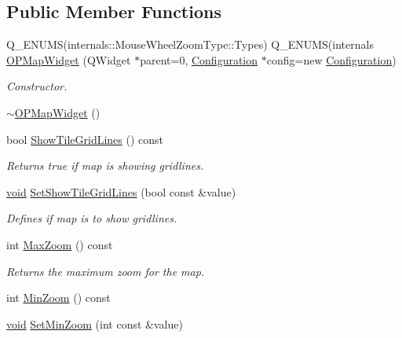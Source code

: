 \subsection*{\-Public \-Member \-Functions}
\begin{DoxyCompactItemize}
\item 
\-Q\-\_\-\-E\-N\-U\-M\-S(internals\-::\-Mouse\-Wheel\-Zoom\-Type\-::\-Types) \*
\-Q\-\_\-\-E\-N\-U\-M\-S(internals \hyperlink{group___o_p_map_widget_ga390f25c0a1e661e1496be4b21c4b4796}{\-O\-P\-Map\-Widget} (\-Q\-Widget $\ast$parent=0, \hyperlink{classmapcontrol_1_1_configuration}{\-Configuration} $\ast$config=new \hyperlink{classmapcontrol_1_1_configuration}{\-Configuration})
\begin{DoxyCompactList}\small\item\em \-Constructor. \end{DoxyCompactList}\item 
\hyperlink{group___o_p_map_widget_gabdcfea44244e345b2e4c966cc8d8c3c6}{$\sim$\-O\-P\-Map\-Widget} ()
\item 
bool \hyperlink{group___o_p_map_widget_ga206c68521bc221bc6db0e63e187c4481}{\-Show\-Tile\-Grid\-Lines} () const 
\begin{DoxyCompactList}\small\item\em \-Returns true if map is showing gridlines. \end{DoxyCompactList}\item 
\hyperlink{group___u_a_v_objects_plugin_ga444cf2ff3f0ecbe028adce838d373f5c}{void} \hyperlink{group___o_p_map_widget_gae09f73466c8f5ba738db48600eab7635}{\-Set\-Show\-Tile\-Grid\-Lines} (bool const \&value)
\begin{DoxyCompactList}\small\item\em \-Defines if map is to show gridlines. \end{DoxyCompactList}\item 
int \hyperlink{group___o_p_map_widget_ga20e653fc57f65044824fd9697d9111a8}{\-Max\-Zoom} () const 
\begin{DoxyCompactList}\small\item\em \-Returns the maximum zoom for the map. \end{DoxyCompactList}\item 
int \hyperlink{group___o_p_map_widget_ga331965564954b53f6fa29812ae5c8f4b}{\-Min\-Zoom} () const 
\item 
\hyperlink{group___u_a_v_objects_plugin_ga444cf2ff3f0ecbe028adce838d373f5c}{void} \hyperlink{group___o_p_map_widget_gaf973bb53af546323b7714f8715bb527d}{\-Set\-Min\-Zoom} (int const \&value)

\end{DoxyCompactItemize}

